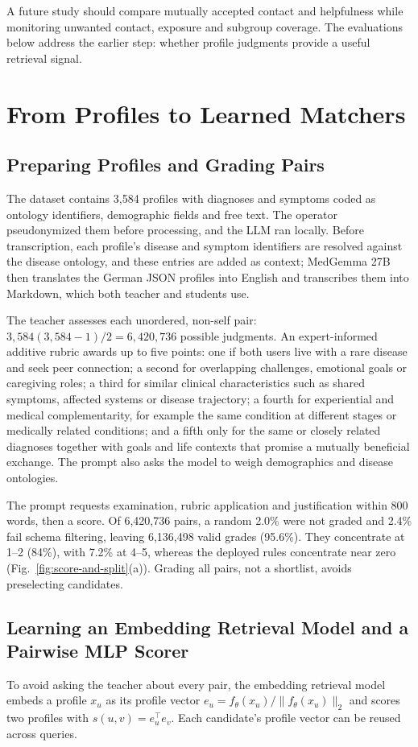 \documentclass[runningheads,a4paper]{llncs}
\begin{document}
A future study should compare mutually accepted contact and helpfulness while monitoring
unwanted contact, exposure and subgroup coverage. The evaluations below address
the earlier step: whether profile judgments provide a useful retrieval signal.

\section{From Profiles to Learned Matchers}
\label{sec:method}
\subsection{Preparing Profiles and Grading Pairs}
\label{sec:profiles}
The dataset contains 3,584 profiles with diagnoses and symptoms coded as
ontology identifiers, demographic fields and free text. The operator pseudonymized them before processing,
and the LLM ran locally. Before transcription, each profile's disease and symptom
identifiers are resolved against the disease ontology, and these entries are
added as context; MedGemma 27B then translates the German JSON profiles into
English and transcribes them into Markdown, which both teacher and students use.

The teacher assesses each unordered, non-self pair:
$3{,}584(3{,}584-1)/2=6{,}420{,}736$ possible judgments. An expert-informed
additive rubric awards up to five points: one if both users live with a rare
disease and seek peer connection; a second for overlapping challenges,
emotional goals or caregiving roles; a third for similar clinical
characteristics such as shared symptoms, affected systems or disease
trajectory; a fourth for experiential and medical complementarity, for example
the same condition at different stages or medically related conditions; and a
fifth only for the same or closely related diagnoses together with goals and
life contexts that promise a mutually beneficial exchange. The prompt also asks
the model to weigh demographics and disease ontologies.

The prompt requests examination, rubric application and justification within
800 words, then a score. Of 6,420,736 pairs, a random 2.0\% were not graded and 2.4\%
fail schema filtering, leaving 6,136,498 valid grades (95.6\%). They concentrate at 1--2 (84\%), with 7.2\% at 4--5, whereas the deployed rules
concentrate near zero (Fig.~\ref{fig:score-and-split}(a)).
Grading all pairs, not a shortlist, avoids preselecting candidates.

\subsection{Learning an Embedding Retrieval Model and a Pairwise MLP Scorer}
To avoid asking the teacher about every pair, the embedding retrieval model embeds a profile $x_u$ as its profile vector
$e_u=f_\theta(x_u)/\|f_\theta(x_u)\|_2$ and scores two profiles with
$s(u,v)=e_u^\top e_v$. Each candidate's profile vector can be reused across queries.
\end{document}
